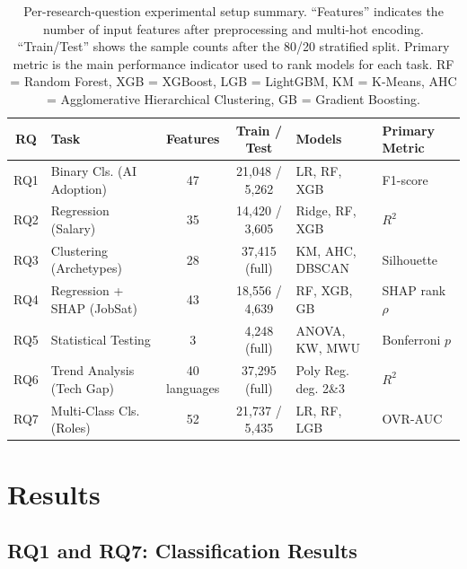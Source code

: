 \documentclass[journal, onecolumn]{IEEEtran}
\begin{document}
\begin{table}[!ht]
\centering
\caption{Per-research-question experimental setup summary. ``Features'' indicates the number of input features after preprocessing and multi-hot encoding. ``Train/Test'' shows the sample counts after the 80/20 stratified split. Primary metric is the main performance indicator used to rank models for each task. RF = Random Forest, XGB = XGBoost, LGB = LightGBM, KM = K-Means, AHC = Agglomerative Hierarchical Clustering, GB = Gradient Boosting.}
\label{tab:ExpSetup}
\begin{tabular}{|c|l|c|c|l|l|}
\hline
\textbf{RQ} & \textbf{Task} & \textbf{Features} & \textbf{Train / Test} & \textbf{Models} & \textbf{Primary Metric} \\ \hline
RQ1 & Binary Cls. (AI Adoption) & 47 & 21,048 / 5,262 & LR, RF, XGB & F1-score \\ \hline
RQ2 & Regression (Salary) & 35 & 14,420 / 3,605 & Ridge, RF, XGB & $R^2$ \\ \hline
RQ3 & Clustering (Archetypes) & 28 & 37,415 (full) & KM, AHC, DBSCAN & Silhouette \\ \hline
RQ4 & Regression + SHAP (JobSat) & 43 & 18,556 / 4,639 & RF, XGB, GB & SHAP rank $\rho$ \\ \hline
RQ5 & Statistical Testing & 3 & 4,248 (full) & ANOVA, KW, MWU & Bonferroni $p$ \\ \hline
RQ6 & Trend Analysis (Tech Gap) & 40 languages & 37,295 (full) & Poly Reg. deg. 2\&3 & $R^2$ \\ \hline
RQ7 & Multi-Class Cls. (Roles) & 52 & 21,737 / 5,435 & LR, RF, LGB & OVR-AUC \\ \hline
\end{tabular}
\end{table}

\section{Results}
\label{sec:results}


\subsection*{RQ1 and RQ7: Classification Results}
\end{document}

